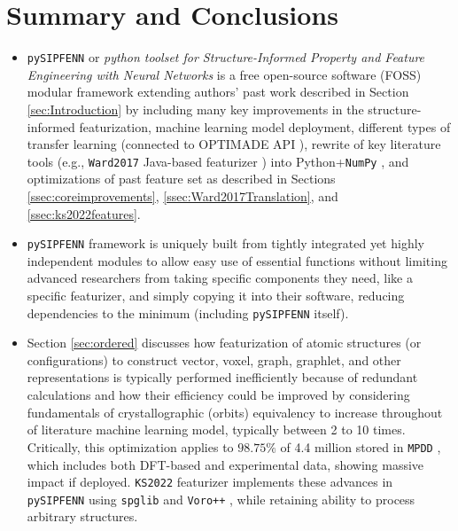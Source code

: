 \section{Summary and Conclusions} \label{sec:summaryconclusions}

\begin{itemize}
    \item \texttt{pySIPFENN} or \textit{python toolset for Structure-Informed Property and Feature Engineering with Neural Networks} is a free open-source software (FOSS) modular framework extending authors' past work \cite{Krajewski2022ExtensibleNetworks} described in Section \ref{sec:Introduction} by including many key improvements in the structure-informed featurization, machine learning model deployment, different types of transfer learning (connected to OPTIMADE API \cite{Evans2024DevelopmentsExchange}), rewrite of key literature tools (e.g., \texttt{Ward2017} Java-based featurizer \cite{Ward2017}) into Python+\texttt{NumPy} \cite{Harris2020ArrayNumPy}, and optimizations of past feature set as described in Sections \ref{ssec:coreimprovements}, \ref{ssec:Ward2017Translation}, and \ref{ssec:ks2022features}.
    
    \item \texttt{pySIPFENN} framework is uniquely built from tightly integrated yet highly independent modules to allow easy use of essential functions without limiting advanced researchers from taking specific components they need, like a specific featurizer, and simply copying it into their software, reducing dependencies to the minimum (including \texttt{pySIPFENN} itself).
    
    \item Section \ref{sec:ordered} discusses how featurization of atomic structures (or configurations) to construct vector, voxel, graph, graphlet, and other representations is typically performed inefficiently because of redundant calculations and how their efficiency could be improved by considering fundamentals of crystallographic (orbits) equivalency to increase throughout of literature machine learning model, typically between 2 to 10 times. Critically, this optimization applies to $98.75\%$ of 4.4 million stored in \texttt{MPDD} \cite{Krajewski2021MPDD:Database}, which includes both DFT-based \cite{Saal2013MaterialsOQMD, Kirklin2015TheEnergies, Shen2022ReflectionsOQMD, Curtarolo2013AFLOW:Discovery, Toher2018TheDiscovery, Jain2013Commentary:Innovation, Choudhary2020TheDesign, Merchant2023ScalingDiscovery} and experimental \cite{Grazulis2009CrystallographyStructures, Grazulis2012CrystallographyCollaboration, Grazulis2019CrystallographyPerspectives} data, showing massive impact if deployed. \texttt{KS2022} featurizer implements these advances in \texttt{pySIPFENN} using \texttt{spglib} \cite{Togo2018Spglib:Search} and \texttt{Voro++} \cite{Rycroft2007MultiscaleFlow, Rycroft2009Voro++:C++, Lu2023AnCells}, while retaining ability to process arbitrary structures.
    

\end{itemize}
